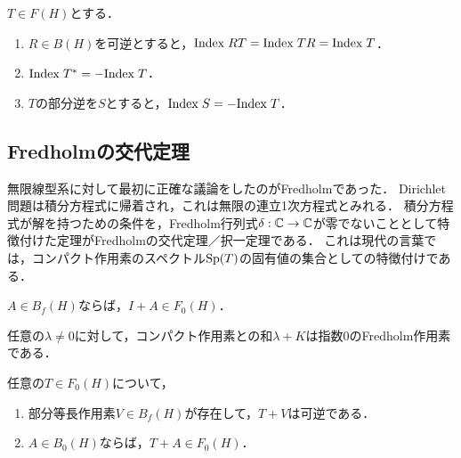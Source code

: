 \documentclass[uplatex,dvipdfmx]{jsreport}
\begin{document}
\begin{lemma}
    $T\in F(H)$とする．
    \begin{enumerate}
        \item $R\in B(H)$を可逆とすると，$\mathrm{Index}\; RT=\mathrm{Index}\; TR=\mathrm{Index}\; T$．
        \item $\mathrm{Index}\; T^*=-\mathrm{Index}\; T$．
        \item $T$の部分逆を$S$とすると，$\mathrm{Index}\; S=-\mathrm{Index}\; T$．
    \end{enumerate}
\end{lemma}

\subsection{Fredholmの交代定理}

\begin{tcolorbox}[colframe=ForestGreen, colback=ForestGreen!10!white,breakable,colbacktitle=ForestGreen!40!white,coltitle=black,fonttitle=\bfseries\sffamily,
title=コンパクト作用素のスペクトルとは固有値の集合である]
    無限線型系に対して最初に正確な議論をしたのがFredholmであった．
    Dirichlet問題は積分方程式に帰着され，これは無限の連立1次方程式とみれる．
    積分方程式が解を持つための条件を，Fredholm行列式$\delta:\mathbb{C}\to\mathbb{C}$が零でないこととして特徴付けた定理がFredholmの交代定理／択一定理である．
    これは現代の言葉では，コンパクト作用素のスペクトル$\mathrm{Sp}(T)$の固有値の集合としての特徴付けである．
\end{tcolorbox}

\begin{lemma}
    $A\in B_f(H)$ならば，$I+A\in F_0(H)$．
\end{lemma}
\begin{remark}
    任意の$\lambda\ne0$に対して，コンパクト作用素との和$\lambda+K$は指数$0$のFredholm作用素である．
\end{remark}

\begin{lemma}
    任意の$T\in F_0(H)$について，
    \begin{enumerate}
        \item 部分等長作用素$V\in B_f(H)$が存在して，$T+V$は可逆である．
        \item $A\in B_0(H)$ならば，$T+A\in F_0(H)$．
    \end{enumerate}
\end{lemma}
\end{document}
